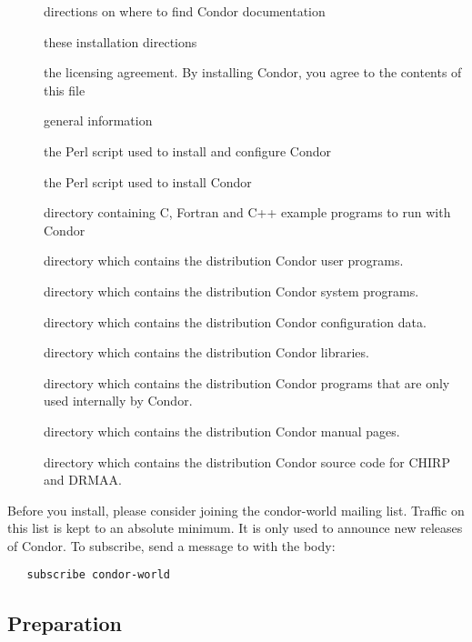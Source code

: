 \begin{description}
\item[] directions on where to find Condor documentation
\item[] these installation directions
\item[] the licensing agreement.
                  By installing Condor, you agree to the contents of
		  this file
\item[] general information
\item[] the Perl script used to install and
                  configure Condor
\item[] the Perl script used to install Condor
\item[] directory containing C, Fortran and C++ example
		  programs to run with Condor
\item[] directory which contains the distribution Condor
		  user programs.
\item[] directory which contains the distribution Condor
		  system programs.
\item[] directory which contains the distribution Condor
		  configuration data.
\item[] directory which contains the distribution Condor
		  libraries.
\item[] directory which contains the distribution Condor
		  programs that are only used internally by Condor.
\item[] directory which contains the distribution Condor
		  manual pages.
\item[] directory which contains the distribution Condor
		  source code for CHIRP and DRMAA.
\end{description}

Before you install, please consider joining the condor-world mailing
list.
Traffic on this list is kept to an absolute minimum.
It is only used to announce new releases of Condor.
To subscribe, send a message to  with the body:
\begin{verbatim}
   subscribe condor-world 
\end{verbatim}

\subsection{\label{sec:Preparing-to-Install}Preparation} 

